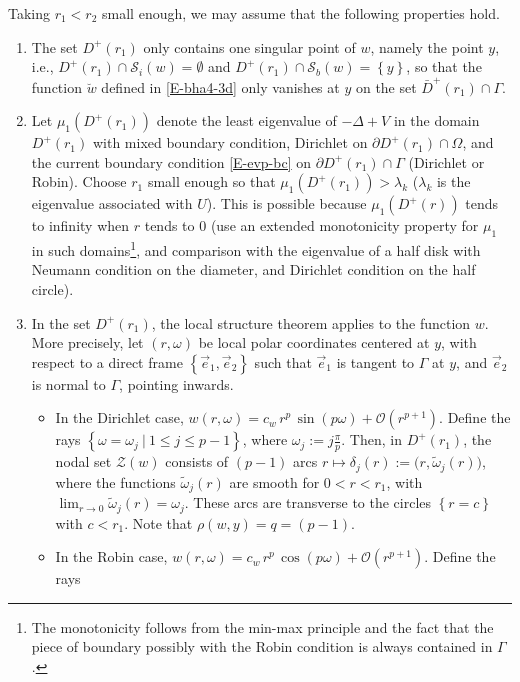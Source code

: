 \documentclass[12pt,a4paper]{amsart}
\theoremstyle{plain} %
\theoremstyle{definition}
\numberwithin{equation}{section}
\numberwithin{figure}{section}
\numberwithin{table}{section}
\newcommand{\cO}{\mathcal{O}}
\newcommand{\cS}{\mathcal{S}}
\newcommand{\cZ}{\mathcal{Z}}
\newcommand{\set}[1]{\left\lbrace #1 \right\rbrace}
\newcommand{\omegat}{\widetilde{\omega}}
\begin{document}
Taking $r_1 < r_2$ small enough, we may assume that the following properties hold.
\begin{enumerate}[(B-a)]
  \item The set $D^{+}(r_1)$ only contains one singular point of $w$, namely the point $y$, i.e., $D^{+}(r_1) \cap \cS_i(w) = \emptyset$ and $D^{+}(r_1) \cap \cS_b(w) = \set{y}$, so that the function $\breve{w}$ defined in \eqref{E-bha4-3d} only vanishes at $y$ on the set $\bar{D}^{+}(r_1) \cap \Gamma $.
  \item  Let $\mu_1(D^{+}(r_1))$ denote the least eigenvalue of $-\Delta + V$ in the domain $D^{+}(r_1)$ with mixed boundary condition, Dirichlet on $\partial D^{+}(r_1) \cap \Omega$, and the current boundary condition \eqref{E-evp-bc} on $\partial D^{+}(r_1) \cap \Gamma $ (Dirichlet or Robin). Choose $r_1$ small enough so that $\mu_1(D^{+}(r_1)) > \lambda_k$ ($\lambda_k$ is the eigenvalue associated with $U$). This is possible because $\mu_1(D^{+}(r))$ tends to infinity when $r$ tends to $0$ (use an extended monotonicity property for $\mu_1$ in such domains\footnote{The monotonicity follows from the min-max principle and the fact that the piece of boundary possibly with the Robin condition is always contained in $\Gamma $.},  and comparison with the eigenvalue of a half disk with Neumann condition on the diameter, and Dirichlet condition on the half circle).
  \item In the set $D^{+}(r_1)$, the local structure theorem applies to the function $w$. More precisely, let $(r,\omega)$ be local polar coordinates centered at $y$,  with respect to a direct frame $\set{\vec{e}_1,\vec{e}_2}$ such
  that $\vec{e}_1$ is tangent to $\Gamma $ at $y$, and $\vec{e}_2$ is normal to $\Gamma $, pointing inwards.
      \begin{itemize}
        \item[$\diamond$] In the Dirichlet case, $w(r,\omega) = c_w \, r^p \, \sin(p\omega) + \cO(r^{p+1})$. Define the rays $\set{\omega = \omega_j~|~ 1 \le j \le p-1}$, where $\omega_j := j \frac{\pi}{p}$. Then, in $D^{+}(r_1)$, the nodal set $\cZ(w)$ consists of $(p-1)$ arcs $r \mapsto \delta_j(r) := \big( r, \omegat_j(r) \big)$, where the functions $\omegat_j(r)$ are smooth for $0 < r < r_1$, with $\lim_{r\to 0}\omegat_j(r) = \omega_j$. These arcs are transverse to the circles $\set{r=c}$ with $c < r_1$. Note that $\rho(w,y) = q = (p-1)$.
        \item[$\diamond$] In the Robin case, $w(r,\omega) = c_w \, r^p \, \cos(p\omega) + \cO(r^{p+1})$. Define the rays

\end{itemize}
\end{enumerate}
\end{document}
